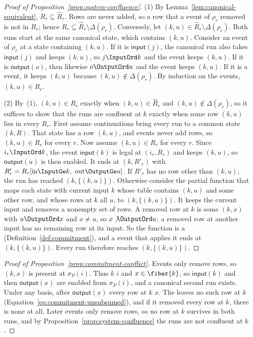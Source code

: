 \begin{proof}[Proof of Proposition~\ref{prop:system-confluence}]
(1) By Lemma~\ref{lem:canonical-equivalent}, $R_r\subseteq\widehat R_r$.
Rows are never added, so a row that a \commitment event of $\rho_r$ removed is
not in $R_r$; hence $R_r\subseteq\widehat R_r\setminus\Delta(\rho_r)$.
Conversely, let $(k,u)\in\widehat R_r\setminus\Delta(\rho_r)$.  Both runs
start at the same canonical state, which contains $(k,u)$.  Consider an event of
$\rho_r$ at a state containing $(k,u)$.  If it is $\mathsf{input}(j)$, the
canonical run also takes $\mathsf{input}(j)$ and keeps $(k,u)$, so
$j\InputOrd k$ and the event keeps $(k,u)$.  If it is $\mathsf{output}(o)$,
then likewise $o\OutputOrd u$ and the event keeps $(k,u)$.  If it is a
\commitment event, it keeps $(k,u)$ because $(k,u)\notin\Delta(\rho_r)$.  By
induction on the events, $(k,u)\in R_r$.

(2) By~(1), $(k,u)\in R_r$ exactly when $(k,u)\in\widehat R_r$ and
$(k,u)\notin\Delta(\rho_r)$, so it suffices to show that the runs are confluent
at $k$ exactly when some row $(k,u)$ lies in every $R_r$.  First assume
continuations bring every run to a common state $(k,R)$.  That state has a row
$(k,u)$, and events never add rows, so $(k,u)\in R_r$ for every $r$.  Now
assume $(k,u)\in R_r$ for every $r$.  Since $i_r\InputOrd k$, the event
$\mathsf{input}(k)$ is legal at $(i_r,R_r)$ and keeps $(k,u)$, so
$\mathsf{output}(u)$ is then enabled.  It ends at $(k,R'_r)$ with
$R'_r=R_r[\mathrm{in}\InputGe k,\ \mathrm{out}\OutputGe u]$.  If $R'_r$ has no
row other than $(k,u)$, the run has reached $(k,\{(k,u)\})$.  Otherwise
consider the partial function that maps each state with current input $k$
whose table contains $(k,u)$ and some other row, and whose rows at $k$ all
\outrelbase $u$, to $(k,\{(k,u)\})$.  It keeps the current input and removes a
nonempty set of rows.  A removed row at $k$ is some $(k,x)$ with
$u\OutputOrd x$ and $x\neq u$, so $x\not\OutputOrd u$; a removed row at
another input has no remaining row at its input.  So the function is a
\commitment (Definition~\ref{def:commitment}), and a \commitment event that
applies it ends at $(k,\{(k,u)\})$.  Every run therefore reaches
$(k,\{(k,u)\})$.
\end{proof}

\begin{proof}[Proof of Proposition~\ref{prop:commitment-conflict}]
Events only remove rows, so $(k,x)$ is present at $\sigma_P(i)$.  Thus $k$
\inrel $i$ and $x\in\fiber{k}$, so $\mathsf{input}(k)$ and then
$\mathsf{output}(x)$ are enabled from $\sigma_P(i)$, and a canonical second
run exists.  Under any basis, after $\mathsf{output}(x)$ every row at $k$
\outrel $x$.  The \commitment leaves no such row at $k$
(Equation~\ref{eq:commitment-unsubsumed}), and if it removed every row at $k$,
there is none at all.  Later events only remove rows, so no row at $k$
survives in both runs, and by Proposition~\ref{prop:system-confluence} the
runs are not confluent at $k$.
\end{proof}

